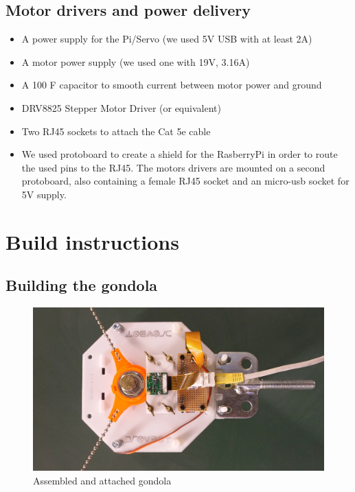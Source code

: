 \documentclass[a4paper,10pt]{article}
\begin{document}
\subsection*{Motor drivers and power delivery}
\begin{itemize}
  \item A power supply for the Pi/Servo (we used 5V USB with at least 2A)
  \item A motor power supply (we used one with 19V, 3.16A)
  \item A 100 \textmu F capacitor to smooth current between motor power and ground
  \item DRV8825 Stepper Motor Driver (or equivalent)
  \item Two RJ45 sockets to attach the Cat 5e cable
  \item We used protoboard to create a shield for the RasberryPi in order to route the used pins to the RJ45. The motors drivers are mounted on a second protoboard, also containing a female RJ45 socket and an micro-usb socket for 5V supply.
\end{itemize}

\clearpage
\section{Build instructions}
\label{sec:buildinst}

\subsection{Building the gondola}

\begin{figure}[h!]
  \centering
  \includegraphics{img/gondola.jpg}
  \caption{Assembled and attached gondola}
  \label{fig:gondola}
\end{figure}
\end{document}
